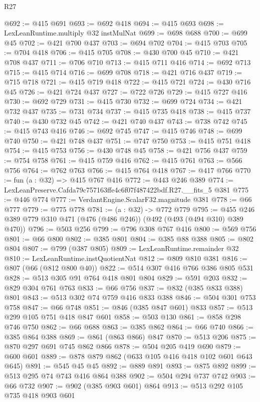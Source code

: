 \begin{lexlean}{R27}
\begin{coremodule}
@692 := @415 @691
@693 := @692 @418
@694 := @415 @693
@698 := LexLeanRuntime.multiply @32 instMulNat
@699 := @698 @688
@700 := @699 @45
@702 := @421 @700 @437
@703 := @694 @702
@704 := @415 @703
@705 := @704 @418
@706 := @415 @705
@708 := @430 @700 @45
@710 := @421 @708 @437
@711 := @706 @710
@713 := @415 @711 @416
@714 := @692 @713
@715 := @415 @714
@716 := @699 @708
@718 := @421 @716 @437
@719 := @715 @718
@721 := @415 @719 @418
@722 := @415 @721
@724 := @430 @716 @45
@726 := @421 @724 @437
@727 := @722 @726
@729 := @415 @727 @416
@730 := @692 @729
@731 := @415 @730
@732 := @699 @724
@734 := @421 @732 @437
@735 := @731 @734
@737 := @415 @735 @418
@738 := @415 @737
@740 := @430 @732 @45
@742 := @421 @740 @437
@743 := @738 @742
@745 := @415 @743 @416
@746 := @692 @745
@747 := @415 @746
@748 := @699 @740
@750 := @421 @748 @437
@751 := @747 @750
@753 := @415 @751 @418
@754 := @415 @753
@756 := @430 @748 @45
@758 := @421 @756 @437
@759 := @754 @758
@761 := @415 @759 @416
@762 := @415 @761
@763 := @566 @756
@764 := @762 @763
@766 := @415 @764 @418
@767 := @417 @766
@770 := fun (a : @32) => @415 @767 @416
@772 := @443 @246 @389
@774 := LexLeanPreserve.Cafda79c757163ffe4c6f07f487422bdf.R27.__fits_5 @381
@775 := @446 @774
@777 := VerdantEngine.ScalarF32.magnitude @381
@778 := @66 @777
@779 := @775 @778
@781 := (a : @32) -> @772 @779
@795 := @455 @246 @389 @779 @310 @471 (@476 (@486 @246)) (@492 (@493 (@494 @310) @389 @470))
@796 := @503 @256
@799 := @796 @308 @767 @416
@800 := @569 @756
@801 := @66 @800
@802 := @385 @801
@804 := @385 @88 @388
@805 := @802 @804
@807 := @799 (@387 @805)
@809 := LexLeanRuntime.remainder @32
@810 := LexLeanRuntime.instQuotientNat
@812 := @809 @810 @381
@816 := @807 (@66 (@812 @800 @40))
@822 := @514 @307 @416 @766 @386 @805 @531
@828 := @513 @305 @91 @764 @418 @801 @804
@829 := @591 @203
@832 := @829 @304 @761 @763
@833 := @66 @756
@837 := @832 (@385 @833 @388) @801
@843 := @513 @302 @74 @759 @416 @833 @388
@846 := @504 @301 @753 @758
@847 := @66 @748
@851 := @846 (@385 @847 @601) @833
@857 := @513 @299 @105 @751 @418 @847 @601
@858 := @503 @130
@861 := @858 @298 @746 @750
@862 := @66 @688
@863 := @385 @862
@864 := @66 @740
@866 := @385 @864 @388
@869 := @861 (@863 @866) @847
@870 := @513 @206
@875 := @870 @297 @691 @745 @862 @866
@878 := @504 @205 @419 @690
@879 := @600 @601
@889 := @878 @879 @862 (@633 @105 @416 @418 @102 @601 @643 @645)
@891 := @545 @45 @45
@892 := @889 @891
@893 := @875 @892
@899 := @513 @295 @74 @743 @416 @864 @388
@902 := @504 @294 @737 @742
@903 := @66 @732
@907 := @902 (@385 @903 @601) @864
@913 := @513 @292 @105 @735 @418 @903 @601

\end{coremodule}
\end{lexlean}
